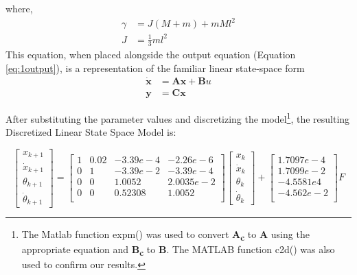 \documentclass{article}
\newcommand{\matr}[1]{\bm{#1}}     %
\begin{document}
where, 
\begin{align*}
\gamma &= J(M+m)+mMl^2 \\
J &= \frac{1}{3}ml^2
\end{align*}
This equation, when placed alongside the output equation (Equation \ref{eq:1output}), is a representation of the familiar linear state-space form
\begin{equation*}
\begin{aligned}
\matr{\dot{x}} &= \matr{A}\matr{x} + \matr{B}u \\
\matr{y} &= \matr{C}\matr{x}
\end{aligned}
\end{equation*}

After substituting the parameter values and discretizing the model\footnote{The Matlab function expm() was used to convert \textbf{A\textsubscript{c}} to \textbf{A} using the appropriate equation and \textbf{B\textsubscript{c}} to \textbf{B}. The MATLAB function c2d() was also used to confirm our results.}, 
the resulting Discretized Linear State Space Model is:

\begin{equation}
\begin{bmatrix}
x_{k+1} \\
\dot{x}_{k+1} \\
\theta_{k+1} \\
\dot{\theta}_{k+1}
\end{bmatrix}
=
\begin{bmatrix}
1 & 0.02 & -3.39e-4 & -2.26e-6\\
0 & 1 & -3.39e-2 & -3.39e-4\\
0 & 0 & 1.0052 & 2.0035e-2\\
0 & 0 & 0.52308 & 1.0052\\
\end{bmatrix}
\begin{bmatrix}
x_{k} \\
\dot{x}_{k} \\
\theta_{k} \\
\dot{\theta}_{k}
\end{bmatrix}
+
\begin{bmatrix}
1.7097e-4\\
1.7099e-2\\
-4.5581e4\\
-4.562e-2\\
\end{bmatrix}
F
\label{eq:linear_discrete}
\end{equation}
\end{document}
